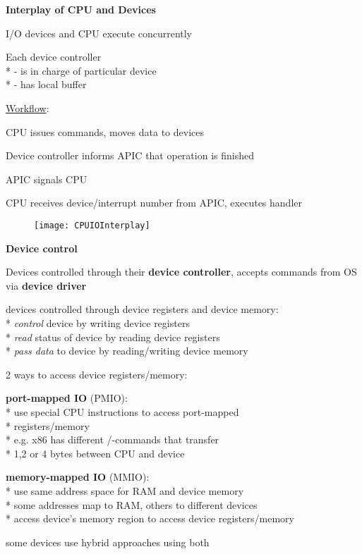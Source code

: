 \textbf{Interplay of CPU and Devices}
\begin{items}
	\item I/O devices and CPU execute concurrently
	\item Each device controller \\*
		- is in charge of particular device \\*
		- has local buffer
	\item \underline{Workflow}:
	\begin{enumeration}
		\item CPU issues commands, moves data to devices
		\item Device controller informs APIC that operation is finished
		\item APIC signals CPU
		\item CPU receives device/interrupt number from APIC, executes handler
	\end{enumeration}
	\begin{figure}[H]\centering\label{CPUIOInterplay}\texttt{[image: CPUIOInterplay]}\end{figure}
\end{items}

\newpage 

\textbf{Device control}
\begin{items}
	\item Devices controlled through their \textbf{device controller}, accepts commands from OS via \textbf{device driver}
	\item devices controlled through device registers and device memory: \\*
		\emph{control} device by writing device registers \\*
		\emph{read} status of device by reading device registers \\*
		\emph{pass data} to device by reading/writing device memory
	\item 2 ways to access device registers/memory:
	\begin{enumeration}
		\item \textbf{port-mapped IO} (PMIO): \\*
			use special CPU instructions to access port-mapped \\* \phantom{x} registers/memory \\*
			e.g. x86 has different /-commands that transfer \\* \phantom{x} 1,2 or 4 bytes between CPU and device
		\item \textbf{memory-mapped IO} (MMIO): \\*
			use same address space for RAM and device memory \\*
			some addresses map to RAM, others to different devices \\*
			access device's memory region to access device registers/memory
	\end{enumeration}
	\item some devices use hybrid approaches using both
\end{items}

